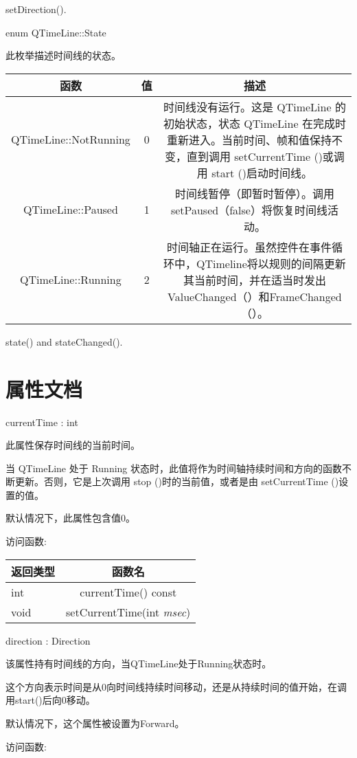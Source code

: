 \begin{seeAlso}
setDirection().
\end{seeAlso}

enum QTimeLine::State

此枚举描述时间线的状态。



\begin{tabular}{|c|c|c|}
\hline
函数 &	值 & 	描述 \\
\hline
QTimeLine::NotRunning &	0 &	时间线没有运行。这是 QTimeLine 的初始状态，状态 QTimeLine 在完成时重新进入。当前时间、帧和值保持不变，直到调用 setCurrentTime ()或调用 start ()启动时间线。\\
\hline
QTimeLine::Paused &	1 &	时间线暂停（即暂时暂停）。调用setPaused（false）将恢复时间线活动。 \\ 
\hline
QTimeLine::Running &	2 	&时间轴正在运行。虽然控件在事件循环中，QTimeline将以规则的间隔更新其当前时间，并在适当时发出ValueChanged（）和FrameChanged（）。\\
\hline
\end{tabular}

\begin{seeAlso}
state() and stateChanged().
\end{seeAlso}

\section{属性文档}

currentTime : int

此属性保存时间线的当前时间。

当 QTimeLine 处于 Running 状态时，此值将作为时间轴持续时间和方向的函数不断更新。否则，它是上次调用 stop ()时的当前值，或者是由 setCurrentTime ()设置的值。

默认情况下，此属性包含值0。

访问函数:


\begin{tabular}{|l|c|}
\hline
返回类型	& 函数名 \\ 
\hline
int &	currentTime() const \\ 
\hline
void& 	setCurrentTime(int \emph{msec}) \\ 
\hline
\end{tabular}

direction : Direction

该属性持有时间线的方向，当QTimeLine处于Running状态时。

这个方向表示时间是从0向时间线持续时间移动，还是从持续时间的值开始，在调用start()后向0移动。

默认情况下，这个属性被设置为Forward。

访问函数:



